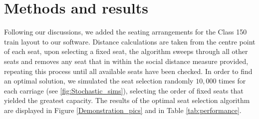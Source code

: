 \documentclass[11pt,a4paper]{article}
\begin{document}
\section*{Methods and results}

Following our discussions, we added the seating arrangements for the Class 150 train layout to our software. Distance calculations are taken from the centre point of each seat, upon selecting a fixed seat, the algorithm sweeps through all other seats and removes any seat that in within the social distance measure provided, repeating this process until all available seats have been checked. In order to find an optimal solution, we simulated the seat selection randomly $10,000$ times for each carriage (see \autoref{fig:Stochastic_sims}), selecting the order of fixed seats that yielded the greatest capacity. The results of the optimal seat selection algorithm are displayed in Figure \ref{Demonstration_pics} and in Table \ref{tab:performance}. 
\end{document}
